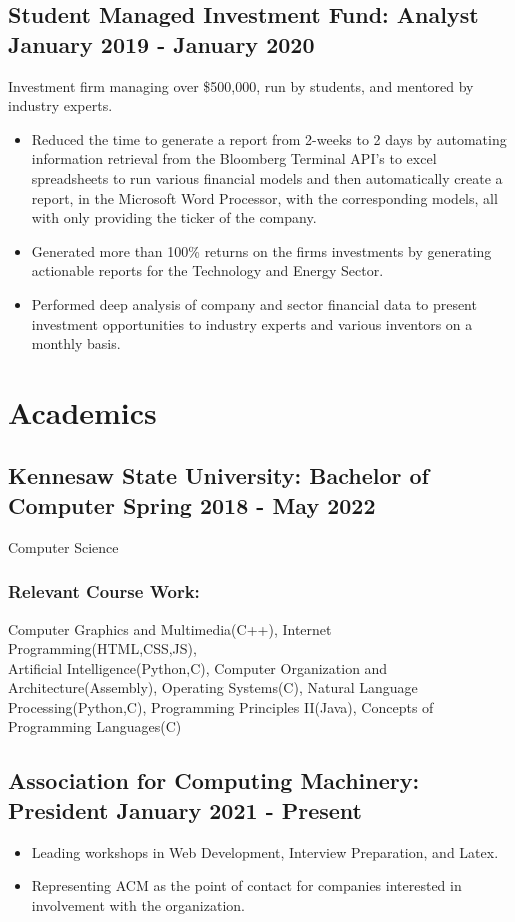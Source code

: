 \documentclass{article}
\begin{document}
\subsection{\large Student Managed Investment Fund: Analyst \hfill \small January 2019 - January 2020}
Investment firm managing over \$500,000, run by students, and mentored by industry experts.
\begin{itemize}
\setlength\itemsep{.1em}
	\item Reduced the time to generate a report from 2-weeks to 2 days by automating information retrieval from the Bloomberg Terminal API's to excel spreadsheets to run various financial models and then automatically create a report, in the Microsoft Word Processor, with the corresponding models, all with only providing the ticker of the company. 
	\item Generated more than 100\% returns on the firms investments by generating actionable reports for the Technology and Energy Sector.
	\item Performed deep analysis of company and sector financial data to present investment opportunities to industry experts and various inventors on a monthly basis. 
\end{itemize}
\section{Academics}
\subsection{\large Kennesaw State University: Bachelor of Computer  \hfill \small Spring 2018 - May 2022}
Computer Science
\subsubsection{Relevant Course Work:} Computer Graphics and Multimedia(C++), Internet Programming(HTML,CSS,JS),\\Artificial Intelligence(Python,C), Computer Organization and Architecture(Assembly), Operating Systems(C), Natural Language Processing(Python,C), Programming Principles II(Java), Concepts of Programming Languages(C)
\subsection{\large Association for Computing Machinery: President \hfill \small January 2021 - Present}
\begin{itemize}
\setlength\itemsep{.1em}
	\item  Leading workshops in Web Development, Interview Preparation, and Latex.
	\item Representing ACM as the point of contact for companies interested in involvement with the organization. 
\end{itemize}
\end{document}
